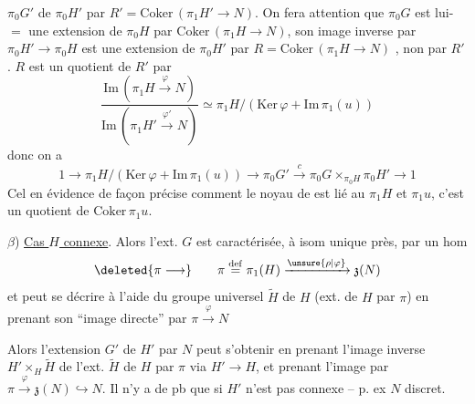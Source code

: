 $\pi_0G'$ de $\pi_0H'$ par $R'=\mathrm{Coker}\,(\pi_1 H'\to N)$. On fera \unsure{$\cdot$} attention que $\pi_0G$ est lui-$=$ une extension de  $\pi_0H$ par $\mathrm{Coker}\,(\pi_1H\to N)$, son image inverse  par $\pi_0 H'\to\pi_0H$ est une extension de $\pi_0H'$ par $R=\mathrm{Coker}\,(\pi_1 H\to N)$ , non par $R'$. $R$ est un quotient de $R'$ par
\[
\frac{\mathrm{Im}\,(\pi_1 H\xrightarrow{\varphi}N)}
     {\mathrm{Im}\,(\pi_1 H'\xrightarrow{\varphi'}N)}
\simeq \pi_1H/(\mathrm{Ker}\,\varphi+\mathrm{Im}\,\pi_1(u))
\]
donc on a
\[
1\to\pi_1H/(\mathrm{Ker}\,\varphi+\mathrm{Im}\,\pi_1(u))\to\pi_0G'
\xrightarrow{c}\pi_0G\times_{\pi_0H}\pi_0H'\to1
\]
Cel   en évidence de façon précise comment le noyau de  est lié au $\pi_1H$ et $\pi_1u$, c'est un quotient de $\mathrm{Coker}\,\pi_1u$.

$\beta$) \uline{Cas $H$ connexe}. Alors l'ext. $G$ est caractérisée, à isom unique près, par un hom
\[
\deleted{\pi\longrightarrow}\qquad
\pi\overset{\mathrm{def}}{=}\pi_1(H)\xrightarrow{\unsure{\rho|\varphi}}\mathfrak z(N)
\]
et peut se décrire à l'aide du groupe  universel $\widetilde H$ de $H$ (ext. de $H$ par $\pi$) en prenant son ``image directe'' par $\pi\xrightarrow{\varphi}N$

Alors l'extension  $G'$ de $H'$ par $N$ peut s'obtenir en prenant l'image inverse $H'\times_H\widetilde H$ de l'ext. $\widetilde H$ de $H$ par $\pi$ via $H'\to H$, et prenant l'image par $\pi\xrightarrow{\varphi}\mathfrak z(N)\hookrightarrow N$. Il n'y a de pb que si $H'$  n'est pas connexe  -- p. ex $N$ discret.  

